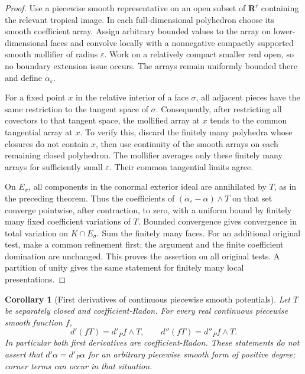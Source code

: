 \documentclass[11pt,a4paper]{article}
\numberwithin{equation}{section}
\newtheorem{corollary}[theorem]{Corollary}
\theoremstyle{definition}
\theoremstyle{remark}
\begin{document}
\begin{proof}
Use a piecewise smooth representative on an open subset of
$\mathbf R^r$ containing the relevant tropical image. In
each full-dimensional polyhedron choose its smooth
coefficient array. Assign arbitrary bounded values to the
array on lower-dimensional faces and convolve locally with
a nonnegative compactly supported smooth mollifier of radius
$\varepsilon$. Work on a relatively compact smaller real
open, so no boundary extension issue occurs. The arrays
remain uniformly bounded there and define $\alpha_\varepsilon$.

For a fixed point $x$ in the relative interior of a face
$\sigma$, all adjacent pieces have the same restriction to
the tangent space of $\sigma$. Consequently, after restricting
all covectors to that tangent space, the mollified array at
$x$ tends to the common tangential array at $x$. To verify
this, discard the finitely many polyhedra whose closures do
not contain $x$, then use continuity of the smooth arrays
on each remaining closed polyhedron. The mollifier averages
only these finitely many arrays for sufficiently small
$\varepsilon$. Their common tangential limits agree.

On $E_\sigma$, all components in the conormal exterior ideal
are annihilated by $T$, as in the preceding theorem. Thus the
coefficients of $(\alpha_\varepsilon-\alpha)\wedge T$ on that
set converge pointwise, after contraction, to zero, with a
uniform bound by finitely many fixed coefficient variations
of $T$. Bounded convergence gives convergence in total
variation on $K\cap E_\sigma$. Sum the finitely many faces.
For an additional original test, make a common refinement
first; the argument and the finite coefficient domination
are unchanged. This proves the assertion on all original
tests. A partition of unity gives the same statement for
finitely many local presentations.
\end{proof}

\begin{corollary}[First derivatives of continuous piecewise smooth potentials]
\label{cor:r6-pws-first-derivative}
Let $T$ be separately closed and coefficient-Radon. For every
real continuous piecewise smooth function $f$,
\[
 d'(fT)=d'_Pf\wedge T,
 \qquad d''(fT)=d''_Pf\wedge T.
\]
In particular both first derivatives are coefficient-Radon.
These statements do not assert that $d'\alpha=d'_P\alpha$
for an arbitrary piecewise smooth form of positive degree;
corner terms can occur in that situation.
\end{corollary}
\end{document}

